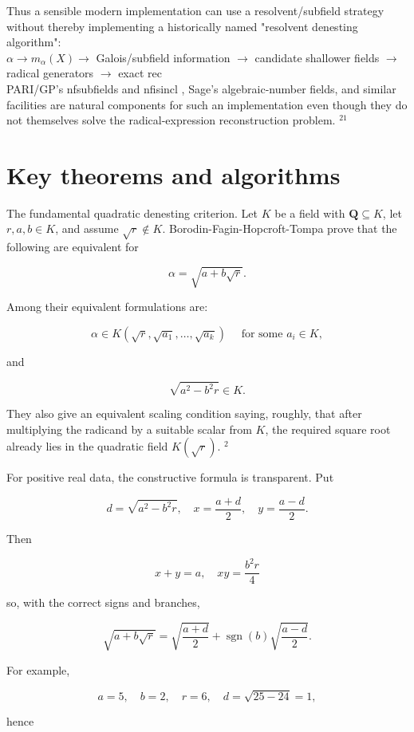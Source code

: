 \documentclass[10pt]{article}
\begin{document}
Thus a sensible modern implementation can use a resolvent/subfield strategy without thereby implementing a historically named "resolvent denesting algorithm":\\
$\alpha \longrightarrow m_{\alpha}(X) \longrightarrow$ Galois/subfield information $\longrightarrow$ candidate shallower fields $\longrightarrow$ radical generators $\longrightarrow$ exact rec\\
PARI/GP's nfsubfields and nfisincl , Sage's algebraic-number fields, and similar facilities are natural components for such an implementation even though they do not themselves solve the radical-expression reconstruction problem. ${ }^{21}$

\section*{Key theorems and algorithms}
The fundamental quadratic denesting criterion. Let $K$ be a field with $\mathbf{Q} \subseteq K$, let $r, a, b \in K$, and assume $\sqrt{r} \notin K$. Borodin-Fagin-Hopcroft-Tompa prove that the following are equivalent for

$$
\alpha=\sqrt{a+b \sqrt{r}} .
$$

Among their equivalent formulations are:

$$
\alpha \in K\left(\sqrt{r}, \sqrt{a_{1}}, \ldots, \sqrt{a_{k}}\right) \quad \text { for some } a_{i} \in K,
$$

and

$$
\sqrt{a^{2}-b^{2} r} \in K .
$$

They also give an equivalent scaling condition saying, roughly, that after multiplying the radicand by a suitable scalar from $K$, the required square root already lies in the quadratic field $K(\sqrt{r})$. ${ }^{2}$

For positive real data, the constructive formula is transparent. Put

$$
d=\sqrt{a^{2}-b^{2} r}, \quad x=\frac{a+d}{2}, \quad y=\frac{a-d}{2} .
$$

Then

$$
x+y=a, \quad x y=\frac{b^{2} r}{4}
$$

so, with the correct signs and branches,

$$
\sqrt{a+b \sqrt{r}}=\sqrt{\frac{a+d}{2}}+\operatorname{sgn}(b) \sqrt{\frac{a-d}{2}} .
$$

For example,

$$
a=5, \quad b=2, \quad r=6, \quad d=\sqrt{25-24}=1,
$$

hence
\end{document}
